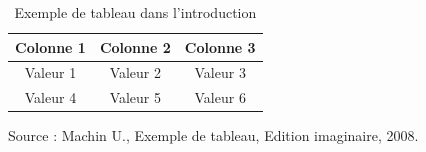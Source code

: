 \begin{table}[!ht]
    \centering
    \begin{tabular}{|c|c|c|}
        \hline
        Colonne 1 & Colonne 2 & Colonne 3 \\
        \hline
        Valeur 1 & Valeur 2 & Valeur 3 \\
        \hline
        Valeur 4 & Valeur 5 & Valeur 6 \\
        \hline
    \end{tabular}
    \caption{Exemple de tableau dans l'introduction}
    \label{tab:example_table}
    \vspace{0.2cm} %
    Source :  Machin U., Exemple de tableau, Edition imaginaire, 2008.
\end{table}


